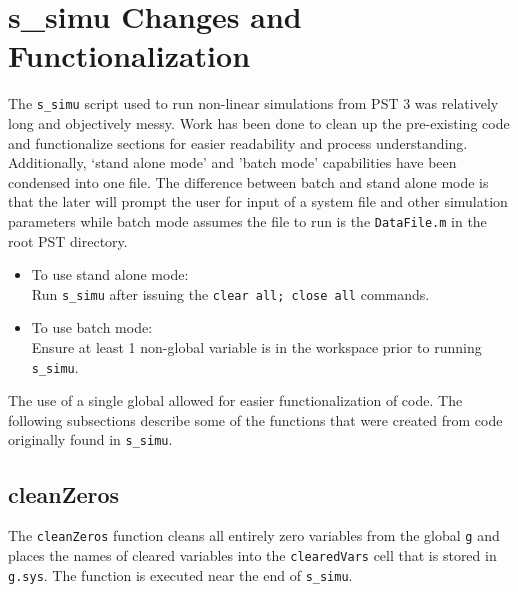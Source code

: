 \pagebreak
\section{s\_simu Changes and Functionalization}
The \verb|s_simu| script used to run non-linear simulations from PST 3 was relatively long and objectively messy.
Work has been done to clean up the pre-existing code and functionalize sections for easier readability and process understanding.
Additionally, `stand alone mode' and 'batch mode' capabilities have been condensed into one file.
The difference between batch and stand alone mode is that the later will prompt the user for input of a system file and other simulation parameters while batch mode assumes the file to run is the \verb|DataFile.m| in the root PST directory.
\begin{itemize}
 em
\item To use stand alone mode:\\
Run \verb|s_simu| after issuing the \verb|clear all; close all| commands.
\item To use batch mode:\\
Ensure at least 1 non-global variable is in the workspace prior to running \verb|s_simu|.
\end{itemize}

The use of a single global allowed for easier functionalization of code.
The following subsections describe some of the functions that were created from code originally found in \verb|s_simu|.

\subsection{cleanZeros}  
The \verb|cleanZeros| function cleans all entirely zero variables from the global \verb|g| and places the names of cleared variables into the \verb|clearedVars| cell that is stored in \verb|g.sys|.
The function is executed near the end of \verb|s_simu|.

